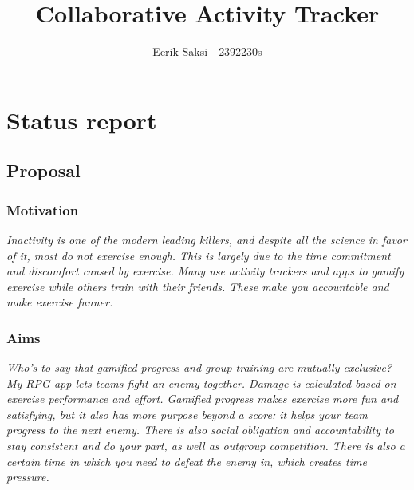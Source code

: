 \documentclass[11pt]{article}
\title{Collaborative Activity Tracker}
\author{ {{Eerik Saksi}} - {{2392230s}} }
\begin{document}
    \maketitle
    
    
     

\section{Status report}

\subsection{Proposal}\label{proposal}

\subsubsection{Motivation}\label{motivation}

    \emph {Inactivity is one of the modern leading killers, and despite all the science in favor of it, most do not exercise enough. This is largely due to the time commitment and discomfort caused by exercise. Many use activity trackers and apps to gamify exercise while others train with their friends. These make you accountable and make exercise funner.} 

\subsubsection{Aims}\label{aims}

   \emph{Who's to say that gamified progress and group training are mutually exclusive? My RPG app lets teams fight an enemy together. Damage is calculated based on exercise performance and effort. Gamified progress makes exercise more fun and satisfying, but it also has more purpose beyond a score: it helps your team progress to the next enemy. There is also social obligation and accountability to stay consistent and do your part, as well as outgroup competition. There is also a certain time in which you need to defeat the enemy in, which creates time pressure.
    }
\end{document}
